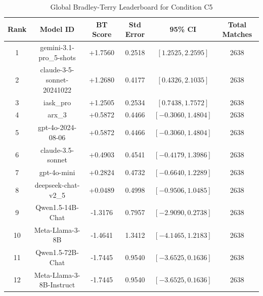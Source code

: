 \begin{table}[ht]
\centering
\caption{Global Bradley-Terry Leaderboard for Condition \textsc{C5}}
\label{tab:leaderboard_c5}
\begin{tabular}{cccccc}
\hline
\textbf{Rank} & \textbf{Model ID} & \textbf{BT Score} & \textbf{Std Error} & \textbf{95\% CI} & \textbf{Total Matches} \\
\hline
1 & gemini-3.1-pro\_5-shots & +1.7560 & 0.2518 & $[1.2525, 2.2595]$ & 2638 \\
2 & claude-3-5-sonnet-20241022 & +1.2680 & 0.4177 & $[0.4326, 2.1035]$ & 2638 \\
3 & iask\_pro & +1.2505 & 0.2534 & $[0.7438, 1.7572]$ & 2638 \\
4 & arx\_3 & +0.5872 & 0.4466 & $[-0.3060, 1.4804]$ & 2638 \\
5 & gpt-4o-2024-08-06 & +0.5872 & 0.4466 & $[-0.3060, 1.4804]$ & 2638 \\
6 & claude-3.5-sonnet & +0.4903 & 0.4541 & $[-0.4179, 1.3986]$ & 2638 \\
7 & gpt-4o-mini & +0.2824 & 0.4732 & $[-0.6640, 1.2289]$ & 2638 \\
8 & deepseek-chat-v2\_5 & +0.0489 & 0.4998 & $[-0.9506, 1.0485]$ & 2638 \\
9 & Qwen1.5-14B-Chat & -1.3176 & 0.7957 & $[-2.9090, 0.2738]$ & 2638 \\
10 & Meta-Llama-3-8B & -1.4641 & 1.3412 & $[-4.1465, 1.2183]$ & 2638 \\
11 & Qwen1.5-72B-Chat & -1.7445 & 0.9540 & $[-3.6525, 0.1636]$ & 2638 \\
12 & Meta-Llama-3-8B-Instruct & -1.7445 & 0.9540 & $[-3.6525, 0.1636]$ & 2638 \\
\hline
\end{tabular}
\end{table}
